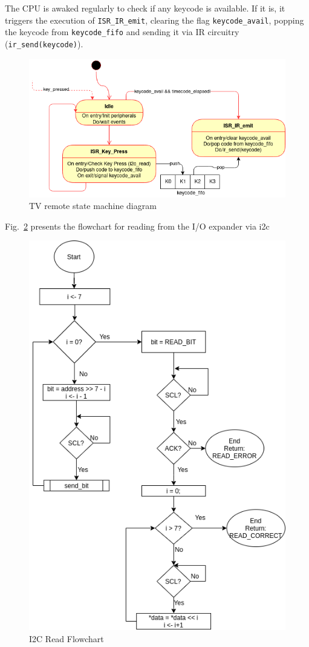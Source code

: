The CPU is awaked regularly to check if any keycode is available. If it is, it
triggers the execution of \texttt{ISR\_IR\_emit}, clearing the flag
\texttt{keycode\_avail}, popping the keycode from \texttt{keycode\_fifo} and
sending it via IR circuitry (\texttt{ir\_send(keycode)}).
%
  \vspace{-5mm}
%  
\begin{figure}[htb!]
\centering
    \includegraphics[width=0.7\columnwidth]{./img/state-mach.png}
  \caption{TV remote state machine diagram}%
\label{fig:state-mach}
\end{figure}

Fig.~\ref{fig:i2cread-flow} presents the flowchart for reading from the I/O expander via i2c

\begin{figure}[htb!]
\centering
    \includegraphics[width=0.7\columnwidth]{./img/i2c_read_flowchart.png}
  \caption{I2C Read Flowchart}%
\label{fig:i2cread-flow}
\end{figure}
%
  \vspace{-5mm}
%  
